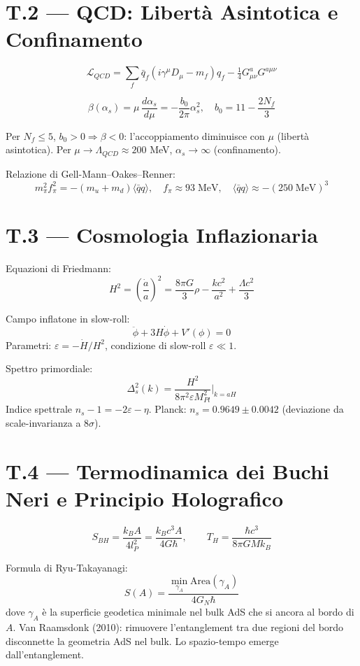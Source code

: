 \documentclass[12pt,a4paper,openany]{book}
\begin{document}
\chapter*{T.2 — QCD: Libertà Asintotica e Confinamento}

\[
\mathcal{L}_{QCD} = \sum_f \bar{q}_f(i\gamma^\mu D_\mu - m_f)q_f - \tfrac{1}{4}G^a_{\mu\nu}G^{a\mu\nu}
\]

\[
\beta(\alpha_s) = \mu\,\frac{d\alpha_s}{d\mu} = -\frac{b_0}{2\pi}\alpha_s^2,\quad b_0 = 11 - \frac{2N_f}{3}
\]

Per $N_f \leq 5$, $b_0 > 0 \Rightarrow \beta < 0$: l'accoppiamento diminuisce con $\mu$ (libertà asintotica). Per $\mu \to \Lambda_{QCD} \approx 200$ MeV, $\alpha_s \to \infty$ (confinamento).

Relazione di Gell-Mann--Oakes--Renner:
\[
m_\pi^2 f_\pi^2 = -(m_u + m_d)\langle\bar{q}q\rangle,\quad f_\pi \approx 93\;\text{MeV},\quad \langle\bar{q}q\rangle \approx -(250\;\text{MeV})^3
\]

\chapter*{T.3 — Cosmologia Inflazionaria}

Equazioni di Friedmann:
\[
H^2 = \left(\frac{\dot{a}}{a}\right)^2 = \frac{8\pi G}{3}\rho - \frac{kc^2}{a^2} + \frac{\Lambda c^2}{3}
\]

Campo inflatone in slow-roll:
\[
\ddot{\phi} + 3H\dot{\phi} + V'(\phi) = 0
\]
Parametri: $\varepsilon = -\dot{H}/H^2$, condizione di slow-roll $\varepsilon \ll 1$.

Spettro primordiale:
\[
\Delta^2_s(k) = \frac{H^2}{8\pi^2 \varepsilon M_{Pl}^2}\bigg|_{k=aH}
\]
Indice spettrale $n_s - 1 = -2\varepsilon - \eta$. Planck: $n_s = 0.9649 \pm 0.0042$ (deviazione da scale-invarianza a $8\sigma$).

\chapter*{T.4 — Termodinamica dei Buchi Neri e Principio Holografico}

\[
S_{BH} = \frac{k_B A}{4 l_P^2} = \frac{k_B c^3 A}{4G\hbar},\qquad T_H = \frac{\hbar c^3}{8\pi G M k_B}
\]

Formula di Ryu-Takayanagi:
\[
S(A) = \frac{\min_{\gamma_A}\mathrm{Area}(\gamma_A)}{4G_N\hbar}
\]
dove $\gamma_A$ è la superficie geodetica minimale nel bulk AdS che si ancora al bordo di $A$. Van Raamsdonk (2010): rimuovere l'entanglement tra due regioni del bordo disconnette la geometria AdS nel bulk. Lo spazio-tempo emerge dall'entanglement.
\end{document}
